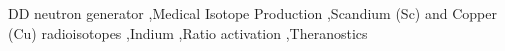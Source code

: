 \documentclass[5p]{elsarticle}
\newcommand{\comment}[1]{\todo[color=blue!20!white,inline]{ASV: #1}}
\begin{document}
\begin{frontmatter}
\begin{abstract}





\end{abstract}

\begin{keyword}
DD neutron generator \sep Medical Isotope Production \sep Scandium (Sc) and Copper (Cu) radioisotopes \sep Indium \sep Ratio activation \sep Theranostics


\end{keyword}

\end{frontmatter}
\end{document}
